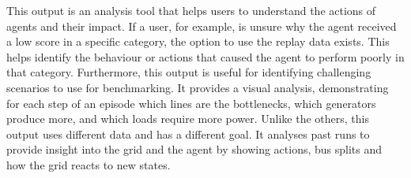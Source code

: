 This output is an analysis tool that helps users to understand the actions of agents and their impact. If a user, for example, is unsure why the agent received a low score in a specific category, the option to use the replay data exists. This helps identify the behaviour or actions that caused the agent to perform poorly in that category. Furthermore, this output is useful for identifying challenging scenarios to use for benchmarking. It provides a visual analysis, demonstrating for each step of an episode which lines are the bottlenecks, which generators produce more, and which loads require more power. Unlike the others, this output uses different data and has a different goal. It analyses past runs to provide insight into the grid and the agent by showing actions, bus splits and how the grid reacts to new states.